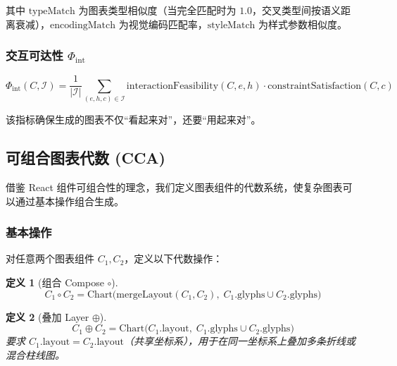 \documentclass[12pt,a4paper]{ctexart}
\newtheorem{definition}{定义}[section]
\theoremstyle{remark}
\begin{document}
其中 $\text{typeMatch}$ 为图表类型相似度（当完全匹配时为 $1.0$，交叉类型间按语义距离衰减），$\text{encodingMatch}$ 为视觉编码匹配率，$\text{styleMatch}$ 为样式参数相似度。

\subsubsection{交互可达性 $\Phi_{\text{int}}$}

\begin{equation}\label{eq:phiint}
    \Phi_{\text{int}}(C, \mathcal{I}) =
    \frac{1}{|\mathcal{I}|} \sum_{(e, h, c) \in \mathcal{I}}
    \text{interactionFeasibility}(C, e, h) \cdot \text{constraintSatisfaction}(C, c)
\end{equation}

该指标确保生成的图表不仅“看起来对”，还要“用起来对”。

\subsection{可组合图表代数 (CCA)}\label{sec:cca}

借鉴 React 组件可组合性的理念，我们定义图表组件的代数系统，使复杂图表可以通过基本操作组合生成。

\subsubsection{基本操作}

对任意两个图表组件 $C_1, C_2$，定义以下代数操作：

\begin{definition}[组合 Compose $\circ$]
    \begin{equation}
        C_1 \circ C_2 = \text{Chart}\big(
            \text{mergeLayout}(C_1, C_2),\;
            C_1.\text{glyphs} \cup C_2.\text{glyphs}
        \big)
    \end{equation}
\end{definition}

\begin{definition}[叠加 Layer $\oplus$]
    \begin{equation}
        C_1 \oplus C_2 = \text{Chart}\big(
            C_1.\text{layout},\;
            C_1.\text{glyphs} \cup C_2.\text{glyphs}
        \big)
    \end{equation}
要求 $C_1.\text{layout} = C_2.\text{layout}$（共享坐标系），用于在同一坐标系上叠加多条折线或混合柱线图。
\end{definition}
\end{document}

